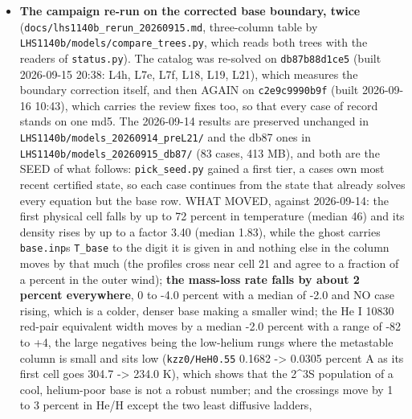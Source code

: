 \documentclass[english,a4paper]{my_memo}
\begin{document}
\begin{itemize}
  R15 formation-state question, an effective thermalization fraction only with
  its timescale conditions stated; R7, "order-dependent reduction" too specific
  -\textgreater{} the wording corrected and the frozen-state residual test made the first
  step of L15. The review\textquotesingle s own order of experiments was adopted as the order
  of the next work, under the standing rule that no pass budget is raised, no
  tolerance loosened, no boundary row suppressed and no rate changed to obtain
  convergence.
\item
  \textbf{The campaign re-run on the corrected base boundary, twice}
  (\texttt{docs/lhs1140b\_rerun\_20260915.md}, three-column table by
  \texttt{LHS1140b/models/compare\_trees.py}, which reads both trees with the readers
  of \texttt{status.py}). The catalog was re-solved on \texttt{db87b88d1ce5} (built
  2026-09-15 20:38: L4h, L7e, L7f, L18, L19, L21), which measures the boundary
  correction itself, and then AGAIN on \texttt{c2e9c9990b9f} (built 2026-09-16 10:43),
  which carries the review fixes too, so that every case of record stands on
  one md5. The 2026-09-14 results are preserved unchanged in
  \texttt{LHS1140b/models\_20260914\_preL21/} and the db87 ones in
  \texttt{LHS1140b/models\_20260915\_db87/} (83 cases, 413 MB), and both are the SEED of
  what follows: \texttt{pick\_seed.py} gained a first tier, a case\textquotesingle s own most recent
  certified state, so each case continues from the state that already solves
  every equation but the base row. WHAT MOVED, against 2026-09-14: the first
  physical cell falls by up to 72 percent in temperature (median 46) and its
  density rises by up to a factor 3.40 (median 1.83), while the ghost carries
  \texttt{base.inp}\textquotesingle s \texttt{T\_base} to the digit it is given in and nothing else in the
  column moves by that much (the profiles cross near cell 21 and agree to a
  fraction of a percent in the outer wind); \textbf{the mass-loss rate falls by about
  2 percent everywhere}, 0 to -4.0 percent with a median of -2.0 and NO case
  rising, which is a colder, denser base making a smaller wind; the He I 10830
  red-pair equivalent width moves by a median -2.0 percent with a range of -82
  to +4, the large negatives being the low-helium rungs where the metastable
  column is small and sits low (\texttt{kzz0/HeH0.55} 0.1682 -\textgreater{} 0.0305 percent A as
  its first cell goes 304.7 -\textgreater{} 234.0 K), which shows that the 2\^{}3S population
  of a cool, helium-poor base is not a robust number; and the crossings move by
  1 to 3 percent in He/H except the two least diffusive ladders,

\end{itemize}
\end{document}
